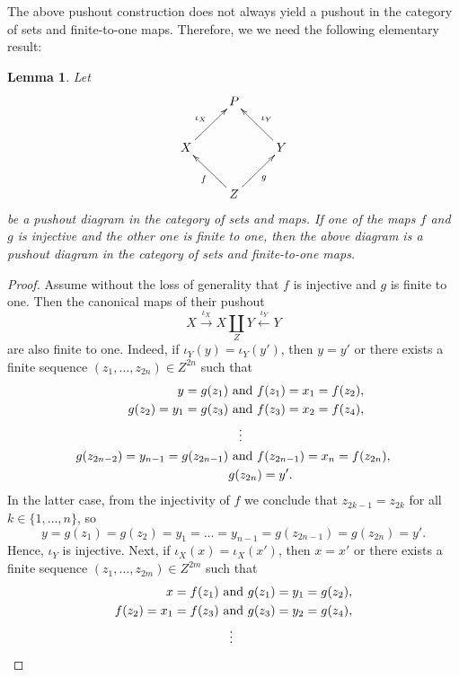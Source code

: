 \documentclass[12pt,times,a4paper]{amsart}
\newtheorem{lemma}[theorem]{Lemma}
\numberwithin{equation}{section}
\def\text{\hbox}
\numberwithin{equation}{section}
\begin{document}
The above pushout construction does not always yield a pushout in the category of sets and finite-to-one maps. Therefore, we 
we need the following elementary result:
\begin{lemma}\label{oneinjective}
Let 
\begin{equation*}
\xymatrix{
&
P
&\\
X
\ar[ur]^{\iota_X}& & 
Y
\ar[ul]_{\iota_Y}\\
&
Z
\ar[ur]_{g}\ar[ul]^{f}&
}
\end{equation*}
be a pushout diagram in the category of sets and maps. If one of the maps $f$ and $g$ is injective and
the other one is finite to one, then the above diagram is a pushout diagram in the category of sets and 
finite-to-one maps.
\end{lemma}
\begin{proof}
Assume without the loss of generality that $f$ is injective and $g$ is finite to one. Then the canonical maps 
of their pushout 
\begin{equation}
X\stackrel{\iota_X}{\longrightarrow}X\underset{Z}{\amalg} Y\stackrel{\iota_Y}{\longleftarrow}Y
\end{equation}
are also finite to one. Indeed, if $\iota_Y(y)=\iota_Y(y')$, then $y=y'$ or there exists a finite
sequence $(z_1,\ldots, z_{2n})\in Z^{2n}$ such that
\begin{align}
y=g(z_1)&\text{ and }f(z_1)=x_1=f(z_2),
\nonumber\\
g(z_2)=y_1=g(z_3)&\text{ and }f(z_3)=x_2=f(z_4),
\nonumber\\
&\;\;\;\vdots
\nonumber\\ 
g(z_{2n-2})=y_{n-1}=g(z_{2n-1})&\text{ and }f(z_{2n-1})=x_{n}=f(z_{2n}),
\nonumber\\ 
&g(z_{2n})=y'.
\end{align}
In the latter case, from the injectivity of $f$ we  conclude that $z_{2k-1}=z_{2k}$ for all $k\in\{1,\ldots,n\}$, so 
\begin{equation}
y=g(z_1)=g(z_{2})=y_1=\dots=y_{n-1}=g(z_{2n-1})=g(z_{2n})=y'.
\end{equation}
 Hence,  $\iota_Y$ is injective.
Next, if $\iota_X(x)=\iota_X(x')$, then $x=x'$ or there exists a finite
sequence $(z_1,\ldots, z_{2m})\in Z^{2m}$ such that
\begin{align}
x=f(z_1)&\text{ and }g(z_1)=y_1=g(z_2),
\nonumber\\
f(z_2)=x_1=f(z_3)&\text{ and }g(z_3)=y_2=g(z_4),
\nonumber\\
&\;\;\;\vdots
\nonumber\\ 

\end{align}
\end{proof}
\end{document}
